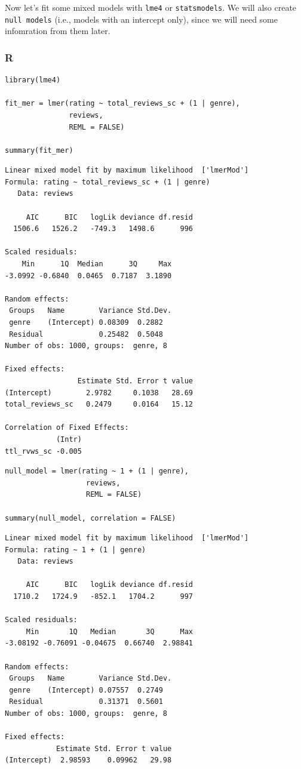 \documentclass[
  letterpaper,
]{krantz}
\begin{document}
Now let's fit some mixed models with \texttt{lme4} or
\texttt{statsmodels}. We will also create \texttt{null\ models} (i.e.,
models with an intercept only), since we will need some infomration from
them later.

\subsubsection{R}

\begin{verbatim}
library(lme4)

fit_mer = lmer(rating ~ total_reviews_sc + (1 | genre), 
               reviews, 
               REML = FALSE)

summary(fit_mer)
\end{verbatim}

\begin{verbatim}
Linear mixed model fit by maximum likelihood  ['lmerMod']
Formula: rating ~ total_reviews_sc + (1 | genre)
   Data: reviews

     AIC      BIC   logLik deviance df.resid 
  1506.6   1526.2   -749.3   1498.6      996 

Scaled residuals: 
    Min      1Q  Median      3Q     Max 
-3.0992 -0.6840  0.0465  0.7187  3.1890 

Random effects:
 Groups   Name        Variance Std.Dev.
 genre    (Intercept) 0.08309  0.2882  
 Residual             0.25482  0.5048  
Number of obs: 1000, groups:  genre, 8

Fixed effects:
                 Estimate Std. Error t value
(Intercept)        2.9782     0.1038   28.69
total_reviews_sc   0.2479     0.0164   15.12

Correlation of Fixed Effects:
            (Intr)
ttl_rvws_sc -0.005
\end{verbatim}

\begin{verbatim}
null_model = lmer(rating ~ 1 + (1 | genre), 
                   reviews, 
                   REML = FALSE)

summary(null_model, correlation = FALSE)
\end{verbatim}

\begin{verbatim}
Linear mixed model fit by maximum likelihood  ['lmerMod']
Formula: rating ~ 1 + (1 | genre)
   Data: reviews

     AIC      BIC   logLik deviance df.resid 
  1710.2   1724.9   -852.1   1704.2      997 

Scaled residuals: 
     Min       1Q   Median       3Q      Max 
-3.08192 -0.76091 -0.04675  0.66740  2.98841 

Random effects:
 Groups   Name        Variance Std.Dev.
 genre    (Intercept) 0.07557  0.2749  
 Residual             0.31371  0.5601  
Number of obs: 1000, groups:  genre, 8

Fixed effects:
            Estimate Std. Error t value
(Intercept)  2.98593    0.09962   29.98
\end{verbatim}
\end{document}
